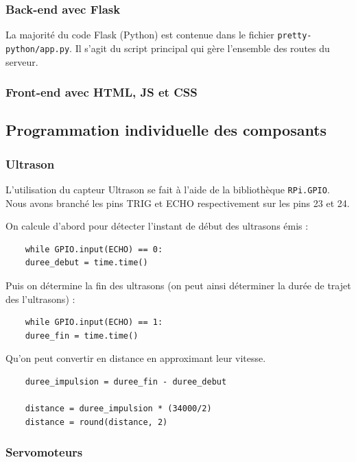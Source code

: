 \documentclass[a4paper,12pt]{report}  %
\begin{document}
\subsubsection{Back-end avec Flask}

La majorité du code Flask (Python) est contenue dans le fichier \texttt{pretty-python/app.py}. Il s’agit du script principal qui gère l’ensemble des routes du serveur. 

\subsubsection{Front-end avec HTML, JS et CSS}



\subsection{Programmation individuelle des composants}



\subsubsection{Ultrason}

L’utilisation du capteur Ultrason se fait à l’aide de la bibliothèque \texttt{RPi.GPIO}.
Nous avons branché les pins TRIG et ECHO respectivement sur les pins 23 et 24.

On calcule d’abord pour détecter l’instant de début des ultrasons émis :
\begin{lstlisting}
	while GPIO.input(ECHO) == 0:   
	duree_debut = time.time()
\end{lstlisting}

Puis on détermine la fin des ultrasons (on peut ainsi déterminer la durée de trajet des l’ultrasons) :
\begin{lstlisting}
	while GPIO.input(ECHO) == 1:
	duree_fin = time.time()
\end{lstlisting}

Qu’on peut convertir en distance en approximant leur vitesse.

\begin{lstlisting}
	duree_impulsion = duree_fin - duree_debut
	
	distance = duree_impulsion * (34000/2)
	distance = round(distance, 2)
\end{lstlisting}

\subsubsection{Servomoteurs}
\end{document}
